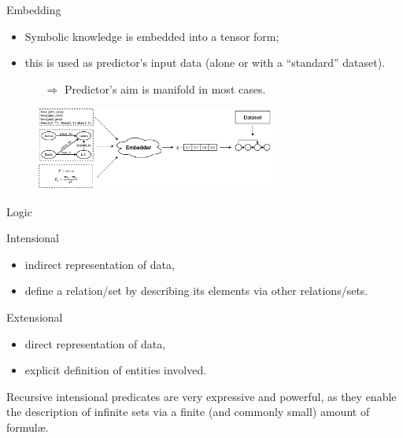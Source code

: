 \documentclass[presentation]{beamer}\mode<presentation>{\usetheme{AMSBolognaFC}}
\begin{document}
\begin{frame}[c]{Embedding}
    \begin{itemize}
        \item Symbolic knowledge is embedded into a tensor form;
        \item this is used as predictor's input data (alone or with a ``standard'' dataset).
        \begin{itemize}
            \item[$\Rightarrow$] Predictor's aim is manifold in most cases.
        \end{itemize} 
    \end{itemize}
    
    \begin{figure}
        \centering
        \includegraphics[width=0.7\textwidth]{figures/ski-embedding}
    \end{figure}
\end{frame}

\begin{frame}[c]{Logic}
    \begin{block}{Intensional}
        \begin{itemize}
            \item indirect representation of data,
            \item define a relation/set by describing its elements via other relations/sets.
        \end{itemize}
    \end{block}
    \begin{block}{Extensional}
        \begin{itemize}
            \item direct representation of data,
            \item explicit definition of entities involved.
        \end{itemize}
    \end{block}
    \vfill
    Recursive intensional predicates are very expressive and powerful, as they enable the description of infinite sets via a finite (and commonly small) amount of formul\ae.
\end{frame}
\end{document}
